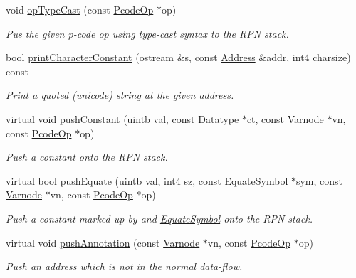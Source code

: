 \begin{DoxyCompactItemize}
void \mbox{\hyperlink{class_print_c_a58330f960ce5acf171b06bde584b5c4a}{op\+Type\+Cast}} (const \mbox{\hyperlink{class_pcode_op}{Pcode\+Op}} $\ast$op)
\begin{DoxyCompactList}\small\item\em Pus the given p-\/code op using type-\/cast syntax to the R\+PN stack. \end{DoxyCompactList}\item 
bool \mbox{\hyperlink{class_print_c_ad15ce25f4039ab09de56be539724f5f7}{print\+Character\+Constant}} (ostream \&s, const \mbox{\hyperlink{class_address}{Address}} \&addr, int4 charsize) const
\begin{DoxyCompactList}\small\item\em Print a quoted (unicode) string at the given address. \end{DoxyCompactList}\item 
virtual void \mbox{\hyperlink{class_print_c_a3db658db938d08395a6e54d3b1c7a372}{push\+Constant}} (\mbox{\hyperlink{types_8h_a2db313c5d32a12b01d26ac9b3bca178f}{uintb}} val, const \mbox{\hyperlink{class_datatype}{Datatype}} $\ast$ct, const \mbox{\hyperlink{class_varnode}{Varnode}} $\ast$vn, const \mbox{\hyperlink{class_pcode_op}{Pcode\+Op}} $\ast$op)
\begin{DoxyCompactList}\small\item\em Push a constant onto the R\+PN stack. \end{DoxyCompactList}\item 
virtual bool \mbox{\hyperlink{class_print_c_ae236127c4e6ea51836f881210aa59ec5}{push\+Equate}} (\mbox{\hyperlink{types_8h_a2db313c5d32a12b01d26ac9b3bca178f}{uintb}} val, int4 sz, const \mbox{\hyperlink{class_equate_symbol}{Equate\+Symbol}} $\ast$sym, const \mbox{\hyperlink{class_varnode}{Varnode}} $\ast$vn, const \mbox{\hyperlink{class_pcode_op}{Pcode\+Op}} $\ast$op)
\begin{DoxyCompactList}\small\item\em Push a constant marked up by and \mbox{\hyperlink{class_equate_symbol}{Equate\+Symbol}} onto the R\+PN stack. \end{DoxyCompactList}\item 
virtual void \mbox{\hyperlink{class_print_c_a234b95d9f3fdb8a79eeff02eb4acbca3}{push\+Annotation}} (const \mbox{\hyperlink{class_varnode}{Varnode}} $\ast$vn, const \mbox{\hyperlink{class_pcode_op}{Pcode\+Op}} $\ast$op)
\begin{DoxyCompactList}\small\item\em Push an address which is not in the normal data-\/flow. \end{DoxyCompactList}\item 

\end{DoxyCompactItemize}
